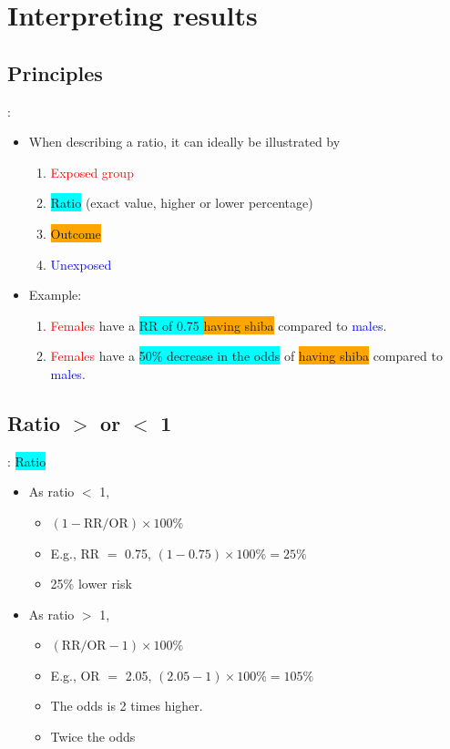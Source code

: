 \section{Interpreting results}
\subsection{Principles}
\begin{frame}{\secname: \subsecname}
\begin{itemize}
\item When describing a ratio, it can ideally be illustrated by 
\begin{enumerate}
	\item \textcolor{red}{Exposed group}
	\item \colorbox{cyan}{Ratio} (exact value, higher or lower percentage)
	\item \colorbox{orange}{Outcome}
	\item \textcolor{blue}{Unexposed}
\end{enumerate}
\item<2|handout:2-> Example:
\begin{enumerate}
\item<2|handout:2-> \textcolor{red}{Females} have a \colorbox{cyan}{RR of 0.75	} \colorbox{orange}{having shiba} compared to \textcolor{blue}{males}.
\item<3|handout:3> \textcolor{red}{Females} have a \colorbox{cyan}{50\% decrease in the odds} of \colorbox{orange}{having shiba} compared to \textcolor{blue}{males}.
\end{enumerate}

\end{itemize}	
\end{frame}

\subsection{Ratio $>$ or $<$ 1}
\begin{frame}{\secname: \subsecname}
\colorbox{cyan}{Ratio}
\begin{itemize}
\item<2|handout:2-> As ratio $<$ 1, 
	\begin{itemize}
			\item $(1-\text{RR}/\text{OR}) \times 100\% $
			\item E.g., RR $=$ 0.75, $(1-0.75) \times 100\% = 25\% $
			\item 25\% lower risk
	\end{itemize}
\item<3|handout:3> As ratio $>$ 1, 
	\begin{itemize}
			\item $(\text{RR}/\text{OR} - 1) \times 100\% $
			\item E.g., OR $=$ 2.05, $(2.05 - 1) \times 100\% = 105\% $
			\item The odds is 2 times higher.
			\item Twice the odds
	\end{itemize}

\end{itemize}
\end{frame}

